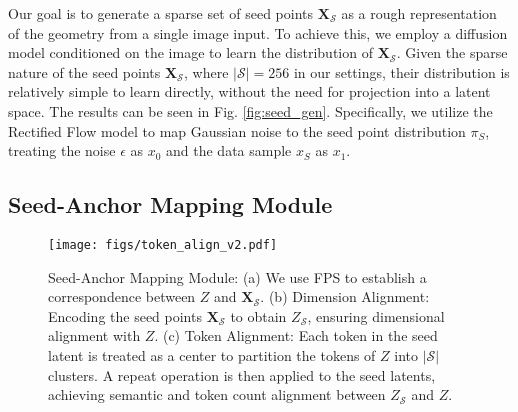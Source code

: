 \label{sec:seed-gen}


Our goal is to generate a sparse set of seed points $\mathbf{X}_\mathcal{S}$ as a rough representation of the geometry from a single image input. To achieve this, we employ a diffusion model conditioned on the image to learn the distribution of $\mathbf{X}_\mathcal{S}$. Given the sparse nature of the seed points \(\mathbf{X}_\mathcal{S}\), where \(|\mathcal{S}| = 256\) in our settings, their distribution is relatively simple to learn directly, without the need for projection into a latent space. The results can be seen in Fig. \ref{fig:seed_gen}. Specifically, we utilize the Rectified Flow model to map Gaussian noise to the seed point distribution \(\pi_S\), treating the noise \(\epsilon\) as \(x_0\) and the data sample \(x_S\) as \(x_1\).



\subsection{Seed-Anchor Mapping Module}
\label{sec:seed-mapping}
\begin{figure}
  \texttt{[image: figs/token\_align\_v2.pdf]}
  \caption{
  Seed-Anchor Mapping Module: 
(a) We use FPS to establish a correspondence between \( Z \) and \( \mathbf{X}_\mathcal{S} \).  
(b) Dimension Alignment: Encoding the seed points \( \mathbf{X}_\mathcal{S} \) to obtain \( Z_\mathcal{S} \), ensuring dimensional alignment with \( Z \).  
(c) Token Alignment: Each token in the seed latent is treated as a center to partition the tokens of \( Z \) into \( |\mathcal{S}| \) clusters. A repeat operation is then applied to the seed latents, achieving semantic and token count alignment between \( Z_\mathcal{S} \) and \( Z \).
  }
  \label{fig:token_align}
\end{figure}

